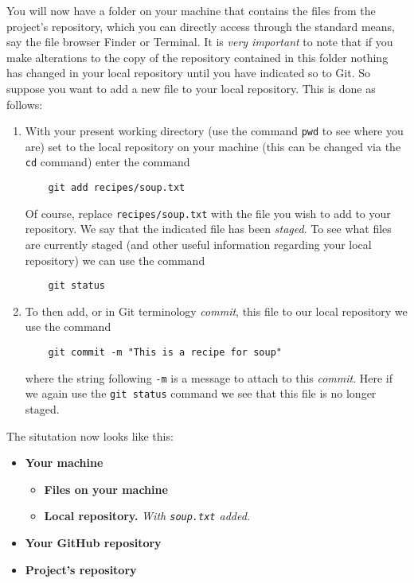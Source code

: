 \documentclass[11pt]{amsart}
\newcommand{\code}[1]{\texttt{#1}}
\begin{document}
You will now have a folder on your machine that contains the files from the project's repository, which you can directly access through the standard means, say the file browser Finder or Terminal. It is \emph{very important} to note that if you make alterations to the copy of the repository contained in this folder nothing has changed in your local repository until you have indicated so to Git. So suppose you want to add a new file to your local repository. This is done as follows: 
\begin{enumerate}
    \item With your present working directory (use the command \code{pwd} to see where you are) set to the local repository on your machine (this can be changed via the \code{cd} command) enter the command

    \begin{BVerbatim}
    git add recipes/soup.txt
    \end{BVerbatim} 

    Of course, replace \code{recipes/soup.txt} with the file you wish to add to your repository. We say that the indicated file has been \emph{staged}. To see what files are currently staged (and other useful information regarding your local repository) we can use the command

    \begin{BVerbatim}
    git status
    \end{BVerbatim}

    \item To then add, or in Git terminology \emph{commit}, this file to our local repository we use the command

    \begin{BVerbatim}
    git commit -m "This is a recipe for soup"
    \end{BVerbatim}

    where the string following \code{-m} is a message to attach to this \emph{commit}. Here if we again use the \code{git status} command we see that this file is no longer staged.
\end{enumerate}

The situtation now looks like this: 
\begin{itemize}
    \item \textbf{Your machine}
    \begin{itemize}
        \item \textbf{Files on your machine}
        \item \textbf{Local repository.} \emph{With \code{soup.txt} added.}
    \end{itemize}
    \item \textbf{Your GitHub repository}
    \item \textbf{Project's repository}
\end{itemize}
\end{document}
